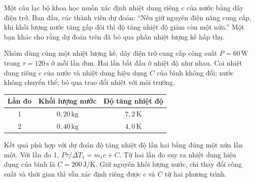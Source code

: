 \begin{ex_test}
Một câu lạc bộ khoa học muốn xác định nhiệt dung riêng $c$ của nước bằng dây điện trở. Ban đầu, các thành viên dự đoán: ``Nếu giữ nguyên điện năng cung cấp, khi khối lượng nước tăng gấp đôi thì độ tăng nhiệt độ giảm còn một nửa.'' Một bạn khác cho rằng dự đoán trên đã bỏ qua phần nhiệt lượng kế hấp thụ.

Nhóm dùng cùng một nhiệt lượng kế, dây điện trở cung cấp công suất $P=60\,\mathrm{W}$ trong $\tau=120\,\mathrm{s}$ ở mỗi lần đun. Hai lần bắt đầu ở nhiệt độ như nhau. Coi nhiệt dung riêng $c$ của nước và nhiệt dung hiệu dụng $C$ của bình không đổi; nước không chuyển thể; bỏ qua trao đổi nhiệt với môi trường.

\begin{center}
\begin{tabular}{|c|c|c|}\hline
Lần đo & Khối lượng nước & Độ tăng nhiệt độ \\ \hline
1 & $0{,}20\,\mathrm{kg}$ & $7{,}2\,\mathrm{K}$ \\ \hline
2 & $0{,}40\,\mathrm{kg}$ & $4{,}0\,\mathrm{K}$ \\ \hline
\end{tabular}
\end{center}
\choiceTF
{Kết quả phù hợp với dự đoán độ tăng nhiệt độ lần hai bằng đúng một nửa lần một.}
{\True Với lần đo 1, $P\tau/\Delta T_1=m_1c+C$.}
{\True Từ hai lần đo suy ra nhiệt dung hiệu dụng của bình là $C=200\,\mathrm{J/K}$.}
{Giữ nguyên khối lượng nước, chỉ thay đổi công suất và thời gian thì vẫn xác định riêng được $c$ và $C$ từ hai phương trình.}
\end{ex_test}


